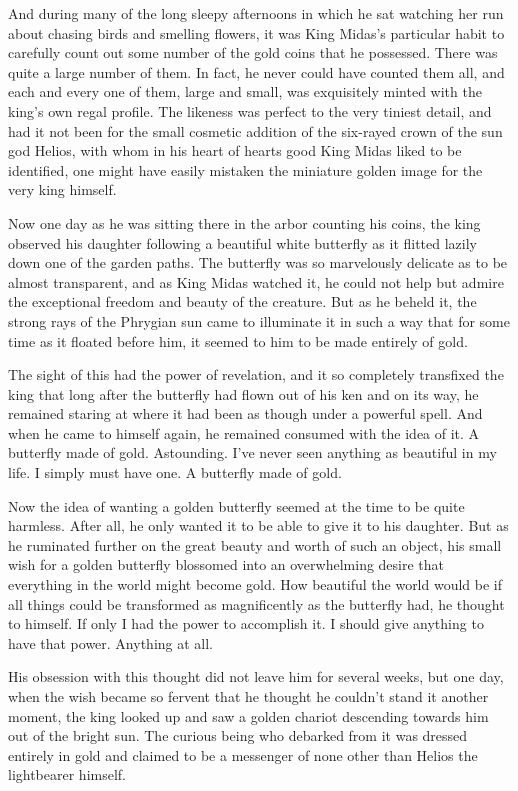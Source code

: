 And during many of the long sleepy afternoons in which he sat watching her run about chasing birds and smelling flowers, it was King Midas's particular habit to carefully count out some number of the gold coins that he possessed. There was quite a large number of them. In fact, he never could have counted them all, and each and every one of them, large and small, was exquisitely minted with the king's own regal profile. The likeness was perfect to the very tiniest detail, and had it not been for the small cosmetic addition of the six-rayed crown of the sun god Helios, with whom in his heart of hearts good King Midas liked to be identified, one might have easily mistaken the miniature golden image for the very king himself.

Now one day as he was sitting there in the arbor counting his coins, the king observed his daughter following a beautiful white butterfly as it flitted lazily down one of the garden paths. The butterfly was so marvelously delicate as to be almost transparent, and as King Midas watched it, he could not help but admire the exceptional freedom and beauty of the creature. But as he beheld it, the strong rays of the Phrygian sun came to illuminate it in such a way that for some time as it floated before him, it seemed to him to be made entirely of gold.

The sight of this had the power of revelation, and it so completely transfixed the king that long after the butterfly had flown out of his ken and on its way, he remained staring at where it had been as though under a powerful spell. And when he came to himself again, he remained consumed with the idea of it. A butterfly made of gold. Astounding. I've never seen anything as beautiful in my life. I simply must have one. A butterfly made of gold.

Now the idea of wanting a golden butterfly seemed at the time to be quite harmless. After all, he only wanted it to be able to give it to his daughter. But as he ruminated further on the great beauty and worth of such an object, his small wish for a golden butterfly blossomed into an overwhelming desire that everything in the world might become gold. How beautiful the world would be if all things could be transformed as magnificently as the butterfly had, he thought to himself. If only I had the power to accomplish it. I should give anything to have that power. Anything at all.

His obsession with this thought did not leave him for several weeks, but one day, when the wish became so fervent that he thought he couldn't stand it another moment, the king looked up and saw a golden chariot descending towards him out of the bright sun. The curious being who debarked from it was dressed entirely in gold and claimed to be a messenger of none other than Helios the lightbearer himself.

